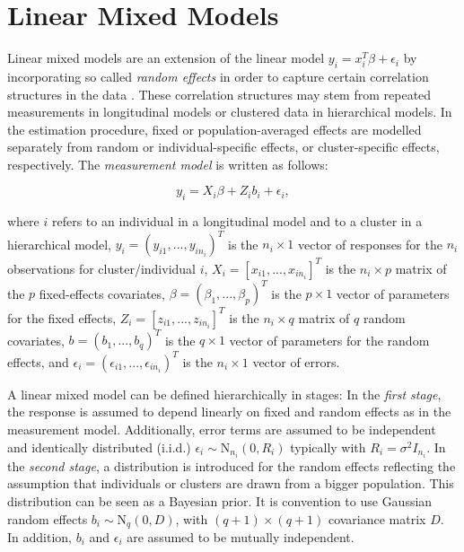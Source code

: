 \documentclass[12pt]{article}
\begin{document}
\section{Linear Mixed Models}\label{lmm}

Linear mixed models are an extension of the linear model $y_i = x^T_i\beta + \epsilon_i$ by incorporating so called \textit{random effects} in order to capture certain correlation structures in the data \cite{fahrmeir2013regression}. These correlation structures may stem from repeated measurements in longitudinal models or clustered data in hierarchical models. In the estimation procedure, fixed or population-averaged effects are modelled separately from random or individual-specific effects, or cluster-specific effects, respectively. The \textit{measurement model} is written as follows:

$$y_i = X_i \beta + Z_i b_i + \epsilon_i,$$

where $i$ refers to an individual in a longitudinal model and to a cluster in a
hierarchical model, $y_i = ( y_{i1},...,y_{in_i} )^T$ is the $n_i \times 1$ vector of responses for the $n_i$ observations for cluster/individual $i$, $X_i = \left[ x_{i1},..., x_{in_i}\right]^T$ is the $n_i \times p$ matrix of the $p$ fixed-effects covariates, $\beta = (\beta_1,...,\beta_p)^T$ is the $p\times1$ vector of parameters for the fixed effects, $Z_i = \left[z_{i1},...,z_{in_i}\right]^T$ is the $n_i\times q$ matrix of $q$ random covariates, $b = (b_1,...,b_q)^T$ is the $q\times1$ vector of parameters for the random effects, and $\epsilon_i = (\epsilon_{i1},...,\epsilon_{in_i})^T$ is the $n_i\times1$ vector of errors. 

A linear mixed model can be defined hierarchically in stages: 
In the \textit{first stage}, the response is assumed to depend linearly on fixed and random effects as in the measurement model. Additionally, error terms are assumed to be independent and identically distributed (i.i.d.) $\epsilon_i \sim \mathrm{N}_{n_i}(0,R_i)$ typically with $R_i=\sigma^2 I_{n_i}$. 
In the \textit{second stage}, a distribution is introduced for the random effects reflecting the assumption that individuals or clusters are drawn from a bigger population.
This distribution can be seen as a Bayesian prior. It is convention to use Gaussian random effects $b_i \sim \mathrm{N}_q(0,D)$, with $(q{+}1)\times (q{+}1)$ covariance matrix $D$. In addition, $b_i$ and $\epsilon_i$ are assumed to be mutually independent. 
\end{document}

